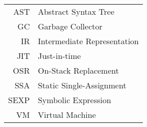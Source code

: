 \documentclass[english,master,twoside]{ctufit-thesis}
\begin{document}
\chapter{\thectufitabbreviationlabel}

\begin{tabular}{rl}
	AST  & Abstract Syntax Tree        \\
	GC   & Garbage Collector           \\
	IR   & Intermediate Representation \\
	JIT  & Just-in-time                \\
	OSR  & On-Stack Replacement        \\
	SSA  & Static Single-Assignment    \\
	SEXP & Symbolic Expression         \\
	VM   & Virtual Machine             \\
\end{tabular}


\resumeTOCentries
\mainmatter\mainmatterinit %









\appendix\appendixinit %

\backmatter %

\printbibliography %
\end{document}
